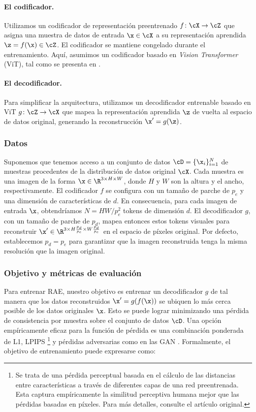 \documentclass[../../book-main_es.tex]{subfiles}
\begin{document}
\paragraph{El codificador.} Utilizamos un codificador de representación preentrenado
$f \colon \cX \to \cZ$ que asigna una muestra de datos de entrada $\x \in \cX$ a
su representación aprendida $\z = f(\x) \in \cZ$. El codificador se mantiene
congelado durante el entrenamiento. Aquí, asumimos un codificador basado en \textit{Vision Transformer} (ViT), tal como
se presenta en .

\paragraph{El decodificador.} Para simplificar la arquitectura, utilizamos un
decodificador entrenable basado en ViT $g \colon \cZ \to \cX$ que mapea la
representación aprendida $\z$ de vuelta al espacio de datos original,
generando la reconstrucción $\x' = g(\z)$.

\subsubsection{Datos}
Suponemos que tenemos acceso a un conjunto de datos $\cD = \{\x_i\}_{i=1}^N$ de muestras
procedentes de la distribución de datos original $\cX$. Cada muestra es una imagen de
la forma $\x \in \R^{3 \times H \times W}$, donde $H$ y $W$ son la
altura y el ancho, respectivamente. El codificador $f$ se configura con un tamaño de parche
de $p_e$ y una dimensión de características de $d$. En consecuencia, para cada
imagen de entrada $\x$, obtendríamos $N = HW/p_e^2$ tokens de dimensión
$d$. El decodificador $g$, con un tamaño de parche de $p_d$, mapea entonces estos tokens visuales
para reconstruir $\x' \in \R^{3 \times H\frac{p_d}{p_e}
\times W\frac{p_d}{p_e}}$ en el espacio de píxeles original. Por defecto,
establecemos $p_d = p_e$ para garantizar que la imagen reconstruida tenga la misma
resolución que la imagen original.

\subsubsection{Objetivo y métricas de evaluación} Para entrenar RAE, nuestro objetivo
es entrenar un decodificador $g$ de tal manera que los datos reconstruidos $\x' =
g(f(\x))$ se ubiquen lo más cerca posible de los datos originales $\x$. Esto se puede
lograr minimizando una pérdida de consistencia por muestra sobre el
conjunto de datos $\cD$. Una opción empíricamente eficaz para la función de pérdida
es una combinación ponderada de L1, LPIPS \cite {zhang2018unreasonable}
\footnote{Se trata de una pérdida perceptual basada en el cálculo de las distancias
entre características a través de diferentes capas de una red preentrenada. Esta
captura empíricamente la similitud perceptiva humana mejor que
las pérdidas basadas en píxeles. Para más detalles, consulte el artículo original.} y
pérdidas adversarias como en las GAN \cite{goodfellow2014generative}.
Formalmente, el objetivo de entrenamiento puede expresarse como:
\end{document}
